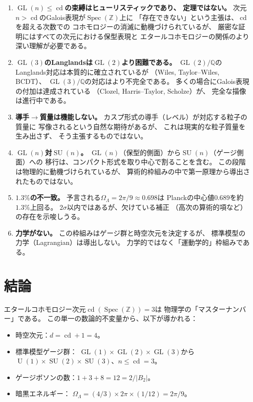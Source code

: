 \documentclass[12pt,a4paper]{article}
\theoremstyle{definition}
\newcommand{\Spec}{\operatorname{Spec}}
\newcommand{\GL}{\operatorname{GL}}
\newcommand{\SU}{\operatorname{SU}}
\newcommand{\cd}{\operatorname{cd}}
\newcommand{\Q}{\mathbb{Q}}
\newcommand{\Z}{\mathbb{Z}}
\newcommand{\OmL}{\Omega_\Lambda}
\newcommand{\U}{\operatorname{U}}
\begin{document}
\begin{enumerate}
  \item \textbf{$\GL(n)\le\cd$の束縛はヒューリスティックであり、
    定理ではない。}
    次元$n > \cd$のGalois表現が$\Spec(\Z)$上に
    「存在できない」という主張は、$\cd$を超える次数での
    コホモロジーの消滅に動機づけられているが、
    厳密な証明にはすべての次元における保型表現と
    エタールコホモロジーの関係のより深い理解が必要である。

  \item \textbf{$\GL(3)$のLanglandsは$\GL(2)$より困難である。}
    $\GL(2)/\Q$のLanglands対応は本質的に確立されているが
    （Wiles, Taylor--Wiles, BCDT）、
    $\GL(3)/\Q$の対応はより不完全である。
    多くの場合にGalois表現の付加は達成されている
    （Clozel, Harris--Taylor, Scholze）が、
    完全な描像は進行中である。

  \item \textbf{導手$\to$質量は機能しない。}
    カスプ形式の導手（レベル）が対応する粒子の質量に
    写像されるという自然な期待があるが、
    これは現実的な粒子質量を生み出さず、
    そう主張するものではない。

  \item \textbf{$\GL(n)$対$\SU(n)$。}
    $\GL(n)$（保型的側面）から$\SU(n)$（ゲージ側面）への
    移行は、コンパクト形式を取り中心で割ることを含む。
    この段階は物理的に動機づけられているが、
    算術的枠組みの中で第一原理から導出されたものではない。

  \item \textbf{$1.3\%$の不一致。}
    予言される$\OmL = 2\pi/9 \approx 0.698$は
    Planckの中心値$0.689$を約$1.3\%$上回る。
    $2\sigma$以内ではあるが、欠けている補正
    （高次の算術的項など）の存在を示唆しうる。

  \item \textbf{力学がない。}
    この枠組みはゲージ群と時空次元を決定するが、
    標準模型の力学（Lagrangian）は導出しない。
    力学的ではなく「運動学的」枠組みである。
\end{enumerate}

\section{結論}\label{sec:conclusion}

エタールコホモロジー次元$\cd(\Spec(\Z))=3$は
物理学の「マスターナンバー」である。
この単一の数論的不変量から、以下が導かれる：
\begin{itemize}
  \item 時空次元：$d = \cd + 1 = 4$。
  \item 標準模型ゲージ群：
    $\GL(1)\times\GL(2)\times\GL(3)$から
    $\U(1)\times\SU(2)\times\SU(3)$、$n\le\cd=3$。
  \item ゲージボソンの数：$1+3+8 = 12 = 2/|B_2|$。
  \item 暗黒エネルギー：
    $\OmL = (4/3)\times 2\pi\times(1/12) = 2\pi/9$。
\end{itemize}
\end{document}
